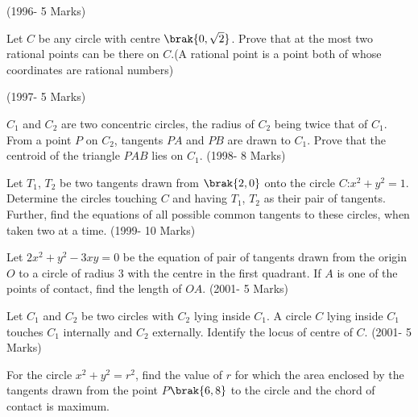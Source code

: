 \hfill(1996- 5 Marks)\\





\item Let $C$ be any circle with centre $\brak{0,\sqrt{2}}$. Prove that at the most two rational points can be there on $C$.(A rational point is a point both of whose coordinates are rational numbers)
	           
\hfill(1997- 5 Marks)\\




\item $C_{1}$ and $C_{2}$ are two concentric circles, the radius of $C_{2}$ being twice that of $C_{1}$. From a point $P$ on $C_{2}$, tangents $PA$ and $PB$ are drawn to $C_{1}$. Prove that the centroid of the triangle $PAB$ lies on $C_{1}$.
	           \hfill(1998- 8 Marks)\\




\item Let $T_{1}$, $T_{2}$ be two tangents drawn from $\brak{2,0}$ onto the circle $C$:$x^2+y^2=1$. Determine the circles touching $C$ and having $T_{1}$, $T_{2}$ as their pair of tangents. Further, find the equations of all possible common tangents to these circles, when taken two at a time.
                  \hfill(1999- 10 Marks)\\




\item Let $2x^2+y^2-3xy=0$ be the equation of pair of tangents drawn from the origin $O$ to a circle of radius 3 with the centre in the first quadrant. If $A$ is one of the points of contact, find the length of $OA$.                   \hfill(2001- 5 Marks)\\




\item Let $C_{1}$ and $C_{2}$ be two circles with $C_{2}$ lying inside $C_{1}$. A circle $C$ lying inside $C_{1}$ touches $C_{1}$ internally and $C_{2}$ externally. Identify the locus of centre of $C$.                                \hfill(2001- 5 Marks)\\



\item For the circle $x^2+y^2=r^2$, find the value of $r$ for which the area enclosed by the tangents drawn from the point $P$$\brak{6,8}$ to the circle and the chord of contact is maximum.


